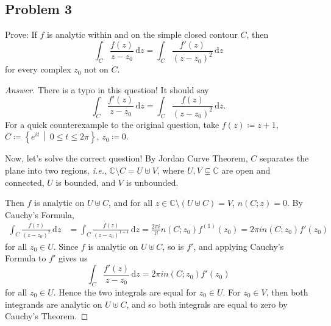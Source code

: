 \documentclass[12pt]{article}
\newcommand{\cx}{\mathbb{C}}
\newcommand{\ita}[1]{\textit{#1}}
\newcommand\paren[1]{\left( #1 \right)}
\newcommand\setb[1]{\left \{ #1 \right \}}
\theoremstyle{definition}
\begin{document}
\subsection{Problem 3}
Prove: If $f$ is analytic within and on the simple closed contour $C$, then 
\[
    \int_C \frac{f(z)}{z-z_0}\, \mathrm{d} z = \int_C \frac{f'(z)}{(z-z_0)^2} \, \mathrm{d} z
\]
for every complex $z_0$ not on $C$.
\begin{proof}[Answer]
    There is a typo in this question! It should say
    \[
        \int_C \frac{f'(z)}{z-z_0}\, \mathrm{d} z = \int_C \frac{f(z)}{(z-z_0)^2} \, \mathrm{d} z.
    \]
    For a quick counterexample to the original question, take $f(z) \coloneqq z+1$, $C \coloneqq \setb{ e^{it} \, \middle| \, 0 \leq t \leq 2\pi }$, $z_0 \coloneqq 0$.
    
    Now, let's solve the correct question! By Jordan Curve Theorem, $C$ separates the plane into two regions, \ita{i.e.}, $\cx \setminus C = U \uplus V$, where $U,V \subsetneq \cx$ are open and connected, $U$ is bounded, and $V$ is unbounded. 
    
    Then $f$ is analytic on $U \uplus C$, and for all $z \in \cx \setminus \paren{ U \uplus C } = V$, $n(C;z) = 0$. By Cauchy's Formula, 
    \begin{align*}
        \int_C \frac{f(z)}{\paren{z-z_0}^2}\, \mathrm{d} z & = \int_C \frac{f(z)}{\paren{z-z_0}^{1+1}}\, \mathrm{d} z = \frac{2\pi i}{1!} n(C;z_0) f^{(1)}(z_0) = 2\pi i n(C;z_0) f'(z_0)
    \end{align*}
    for all $z_0 \in U$. Since $f$ is analytic on $U \uplus C$, so is $f'$, and applying Cauchy's Formula to $f'$ gives us 
    \[
        \int_C \frac{f'(z)}{z-z_0} \, \mathrm{d} z = 2\pi i n(C;z_0) f'(z_0)
    \]
    for all $z_0 \in U$. Hence the two integrals are equal for $z_0 \in U$. For $z_0 \in V$, then both integrands are analytic on $U \uplus C$, and so both integrals are equal to zero by Cauchy's Theorem. 
\end{proof}
\end{document}
